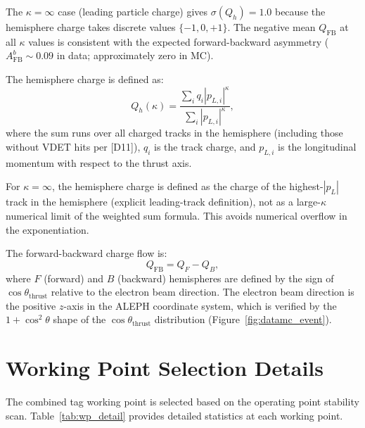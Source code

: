 \documentclass[11pt,a4paper]{article}
\begin{document}
The $\kappa = \infty$ case (leading particle charge) gives $\sigma(Q_h) = 1.0$ because
the hemisphere charge takes discrete values $\{-1, 0, +1\}$. The negative mean
$Q_\mathrm{FB}$ at all $\kappa$ values is consistent with the expected forward-backward
asymmetry ($A_\mathrm{FB}^b \sim 0.09$ in data; approximately zero in MC).

The hemisphere charge is defined as:
\begin{equation}
Q_h(\kappa) = \frac{\sum_i q_i |p_{L,i}|^\kappa}{\sum_i |p_{L,i}|^\kappa},
\label{eq:hemisphere_charge_app}
\end{equation}
where the sum runs over all charged tracks in the hemisphere (including those without
VDET hits per [D11]), $q_i$ is the track charge, and $p_{L,i}$ is the longitudinal
momentum with respect to the thrust axis.

For $\kappa = \infty$, the hemisphere charge is defined as the charge of the
highest-$|p_L|$ track in the hemisphere (explicit leading-track definition), not
as a large-$\kappa$ numerical limit of the weighted sum formula. This avoids
numerical overflow in the exponentiation.

The forward-backward charge flow is:
\begin{equation}
Q_\mathrm{FB} = Q_F - Q_B,
\label{eq:qfb_definition}
\end{equation}
where $F$ (forward) and $B$ (backward) hemispheres are defined by the sign of
$\cos\theta_\mathrm{thrust}$ relative to the electron beam direction. The electron
beam direction is the positive $z$-axis in the ALEPH coordinate system, which is
verified by the $1 + \cos^2\theta$ shape of the $\cos\theta_\mathrm{thrust}$
distribution (Figure~\ref{fig:datamc_event}).

\section{Working Point Selection Details}
\label{app:working_point}

The combined tag working point is selected based on the operating point stability
scan. Table~\ref{tab:wp_detail} provides detailed statistics at each working point.
\end{document}
